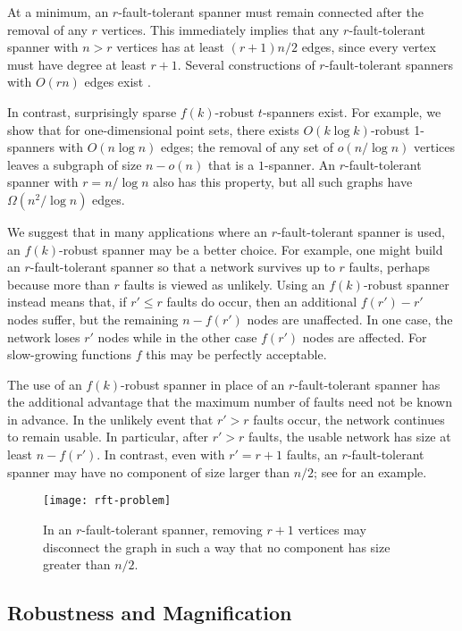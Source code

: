 \documentclass{patmorin}
\begin{document}
At a minimum, an $r$-fault-tolerant spanner must remain connected
after the removal of any $r$ vertices.  This immediately implies
that any $r$-fault-tolerant spanner with $n>r$ vertices has at least
$(r+1)n/2$ edges, since every vertex must have degree at least $r+1$.
Several constructions of $r$-fault-tolerant spanners with $O(rn)$ edges
exist \cite{cz04,lns02,l99}.

In contrast, surprisingly sparse $f(k)$-robust $t$-spanners exist.
For example, we show that for one-dimensional point sets, there exists
$O(k\log k)$-robust 1-spanners with $O(n\log n)$ edges; the removal of
any set of $o(n/\log n)$ vertices leaves a subgraph of size $n-o(n)$ that
is a $1$-spanner.  An $r$-fault-tolerant spanner with $r=n/\log n$ also
has this property, but all such graphs have $\Omega(n^2/\log n)$ edges.

We suggest that in many applications where an $r$-fault-tolerant spanner
is used, an $f(k)$-robust spanner may be a better choice.  For example,
one might build an $r$-fault-tolerant spanner so that a network survives
up to $r$ faults, perhaps because more than $r$ faults is viewed as
unlikely.  Using an $f(k)$-robust spanner instead means that, if $r'\le
r$ faults do occur, then an additional $f(r')-r'$ nodes suffer, but the
remaining $n-f(r')$ nodes are unaffected.  In one case, the network
loses $r'$ nodes while in the other case $f(r')$ nodes are affected.
For slow-growing functions $f$ this may be perfectly acceptable.

The use of an $f(k)$-robust spanner in place of an $r$-fault-tolerant
spanner has the additional advantage that the maximum number of faults
need not be known in advance.  In the unlikely event that $r'> r$
faults occur, the network continues to remain usable.  In particular,
after $r'>r$ faults, the usable network has size at least $n-f(r')$. In
contrast, even with $r'=r+1$ faults, an $r$-fault-tolerant spanner may
have no component of size larger than $n/2$; see 
for an example.

\begin{figure}
  \begin{center}
    \texttt{[image: rft-problem]}
  \end{center}
  \caption{In an $r$-fault-tolerant spanner, removing $r+1$ vertices may
  disconnect the graph in such a way that no component has size greater
  than $n/2$.}
\end{figure}

\subsection{Robustness and Magnification}
\end{document}
